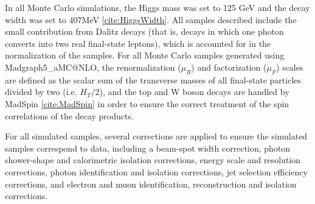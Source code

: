In all Monte Carlo simulations, the Higgs mass was set to 125 GeV and the decay width was set to 407MeV \ref{cite:HiggsWidth}. All samples described include the small contribution from Dalitz decays (that is, decays in which one photon converts into two real final-state leptons), which is accounted for in the normalization of the samples. For all Monte Carlo samples generated using Madgraph5_aMC@NLO, the renormalization ($μ_{R}$) and factorization ($μ_{F}$) scales are defined as the scalar sum of the transverse masses of all final-state particles divided by two (i.e. $H_{T}/2$), and the top and W boson decays are handled by MadSpin \ref{cite:MadSpin} in order to ensure the correct treatment of the spin correlations of the decay products.

For all simulated samples, several corrections are applied to ensure the simulated samples correspond to data, including a beam-spot width correction, photon shower-shape and calorimetric isolation corrections, energy scale and resolution corrections, photon identification and isolation corrections, jet selection efficiency corrections, and electron and muon identification, reconstruction and isolation corrections.

\begin{table}[h!]
  \centering
  \caption{Summary of nominal signal samples}
  \label{tab:signal_samples_pyt}
\end{table}

